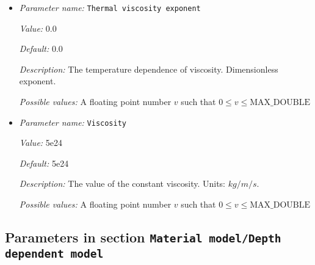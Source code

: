\begin{itemize}
{\it Default:} 2e-5


{\it Description:} The value of the thermal expansion coefficient $\beta$. Units: $1/K$.


{\it Possible values:} A floating point number $v$ such that $0 \leq v \leq \text{MAX\_DOUBLE}$
\item {\it Parameter name:} {\tt Thermal viscosity exponent}
\label{parameters:Material model/Composition reaction model/Thermal viscosity exponent}


{\it Value:} 0.0


{\it Default:} 0.0


{\it Description:} The temperature dependence of viscosity. Dimensionless exponent.


{\it Possible values:} A floating point number $v$ such that $0 \leq v \leq \text{MAX\_DOUBLE}$
\item {\it Parameter name:} {\tt Viscosity}
\label{parameters:Material model/Composition reaction model/Viscosity}


{\it Value:} 5e24


{\it Default:} 5e24


{\it Description:} The value of the constant viscosity. Units: $kg/m/s$.


{\it Possible values:} A floating point number $v$ such that $0 \leq v \leq \text{MAX\_DOUBLE}$
\end{itemize}

\subsection{Parameters in section \tt Material model/Depth dependent model}
\label{parameters:Material_20model/Depth_20dependent_20model}

